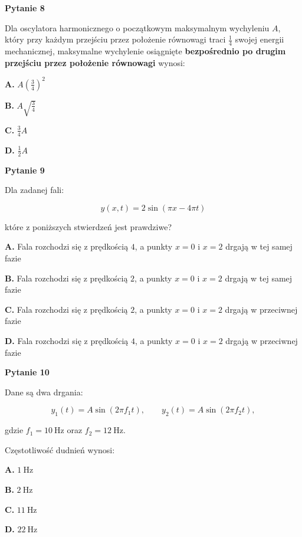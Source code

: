 \documentclass[11pt,a4paper]{article}
\begin{document}
\newpage

{\LARGE\textbf{Pytanie 8}}

Dla oscylatora harmonicznego o początkowym maksymalnym wychyleniu $A$, który przy każdym przejściu przez położenie równowagi traci $\frac{1}{4}$ swojej energii mechanicznej, maksymalne wychylenie osiągnięte \textbf{bezpośrednio po drugim przejściu przez położenie równowagi} wynosi:

\vspace{0.5em}

{\large
\textbf{A.} $A\left(\frac{3}{4}\right)^2$

\textbf{B.} $A\sqrt{\frac{3}{4}}$

\textbf{C.} $\frac{3}{4}A$

\textbf{D.} $\frac{1}{2}A$
}

\newpage

{\LARGE\textbf{Pytanie 9}}

Dla zadanej fali:

\[
y(x,t)=2\sin(\pi x-4\pi t)
\]

które z poniższych stwierdzeń jest prawdziwe?

\vspace{0.5em}

{\large
\textbf{A.} Fala rozchodzi się z prędkością $4$, a punkty $x=0$ i $x=2$ drgają w tej samej fazie

\textbf{B.} Fala rozchodzi się z prędkością $2$, a punkty $x=0$ i $x=2$ drgają w tej samej fazie

\textbf{C.} Fala rozchodzi się z prędkością $2$, a punkty $x=0$ i $x=2$ drgają w przeciwnej fazie

\textbf{D.} Fala rozchodzi się z prędkością $4$, a punkty $x=0$ i $x=2$ drgają w przeciwnej fazie
}

\newpage

{\LARGE\textbf{Pytanie 10}}

Dane są dwa drgania:

\[
y_1(t)=A\sin(2\pi f_1 t), \qquad y_2(t)=A\sin(2\pi f_2 t),
\]

gdzie $f_1=10\ \text{Hz}$ oraz $f_2=12\ \text{Hz}$.

Częstotliwość dudnień wynosi:

\vspace{0.5em}

{\large
\textbf{A.} $1\ \text{Hz}$

\textbf{B.} $2\ \text{Hz}$

\textbf{C.} $11\ \text{Hz}$

\textbf{D.} $22\ \text{Hz}$
}
\end{document}
